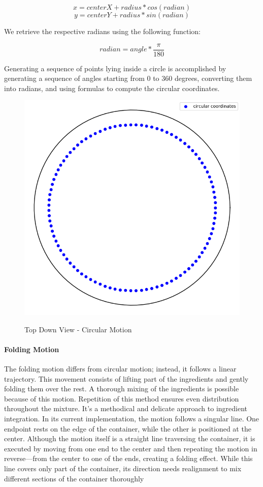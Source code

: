 \[x = centerX + radius * cos(radian)\]
\[y = centerY + radius * sin(radian)\]

We retrieve the respective radians using the following function:

\[radian = angle * \frac{\pi}{180}\]

Generating a sequence of points lying inside a circle is accomplished by generating a sequence of angles starting from 0 to 360 degrees, 
converting them into radians, and using formulas to compute the circular coordinates.

\begin{figure}[H]
    \includegraphics[scale=0.35]{Graphics/motions/circular_motion.png}
    \centering
    \label{fig:circularMotion}
    \caption{Top Down View - Circular Motion}
\end{figure}

\paragraph{Folding Motion}
The folding motion differs from circular motion; instead, it follows a linear trajectory.
This movement consists of lifting part of the ingredients and gently folding them over the rest.
A thorough mixing of the ingredients is possible because of this motion. Repetition of this method ensures even distribution throughout the mixture. 
It's a methodical and delicate approach to ingredient integration.
\newline
\newline
In its current implementation, the motion follows a singular line. One endpoint rests on the edge of the container, while the other is positioned at the center.
Although the motion itself is a straight line traversing the container, it is executed by moving from one end to the center and then repeating 
the motion in reverse—from the center to one of the ends, creating a folding effect.
While this line covers only part of the container, its direction needs realignment to mix different sections of the container thoroughly

